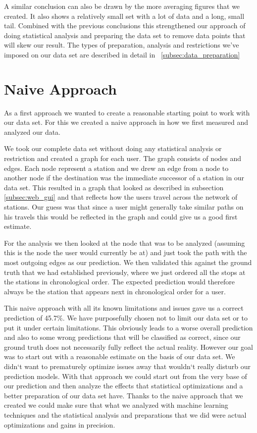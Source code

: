 A similar conclusion can also be drawn by the more averaging figures that we created. It also shows a relatively small set with a lot of data and a long, small tail. Combined with the previous conclusions this strengthened our approach of doing statistical analysis and preparing the data set to remove data points that will skew our result. The types of preparation, analysis and restrictions we've imposed on our data set are described in detail in ~\ref{subsec:data_preparation}

\section{Naive Approach}

As a first approach we wanted to create a reasonable starting point to work with our data set. For this we created a naive approach in how we first measured and analyzed our data. 

We took our complete data set without doing any statistical analysis or restriction and created a graph for each user. The graph consists of nodes and edges. Each node represent a station and we drew an edge from a node to another node if the destination was the immediate successor of a station in our data set. This resulted in a graph that looked as described in subsection \ref{subsec:web_gui} and that reflects how the users travel across the network of stations. Our guess was that since a user might generally take similar paths on his travels this would be reflected in the graph and could give us a good first estimate.

For the analysis we then looked at the node that was to be analyzed (assuming this is the node the user would currently be at) and just took the path with the most outgoing edges as our prediction. We then validated this against the ground truth that we had established previously, where we just ordered all the stops at the stations in chronological order. The expected prediction would therefore always be the station that appears next in chronological order for a user. 

This naive approach with all its known limitations and issues gave us a correct prediction of 45.7\%. We have purposefully chosen not to limit our data set or to put it under certain limitations. This obviously leads to a worse overall prediction and also to some wrong predictions that will be classified as correct, since our ground truth does not necessarily fully reflect the actual reality. However our goal was to start out with a reasonable estimate on the basis of our data set. We didn`t want to prematurely optimize issues away that wouldn`t really disturb our prediction models. With that approach we could start out from the very base of our prediction and then analyze the effects that statistical optimizations and a better preparation of our data set have. Thanks to the naive approach that we created we could make sure that what we analyzed with machine learning techniques and the statistical analysis and preparations that we did were actual optimizations and gains in precision.

